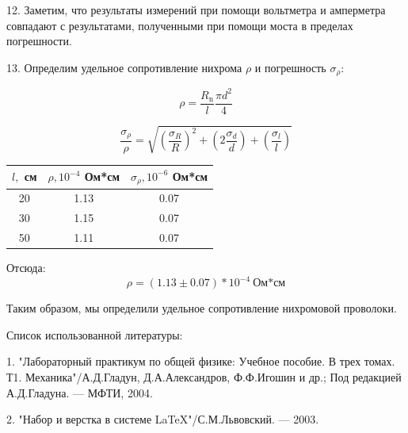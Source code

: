 \documentclass[14pt]{article}
\begin{document}
	
	\vspace{0.5cm}
	12. Заметим, что результаты измерений при помощи вольтметра и амперметра совпадают с результатами, полученными при помощи
	моста в пределах погрешности.
	
	\vspace{0.5cm}
	13. Определим удельное сопротивление нихрома $\rho$ и погрешность $\sigma_\rho$:
	
	$$\rho = \frac{R_\text{n}}{l}\frac{\pi d^2}{4}$$
	
	$$\frac{\sigma_\rho}{\rho} = \sqrt{\left(\frac{\sigma_R}{R}\right)^2 + \left(2\frac{\sigma_d}{d}\right) + 
	\left(\frac{\sigma_l}{l}\right)}$$	
	
	\vspace{0.5cm}
	\begin{center}
	\begin{tabular}{|c|c|c|}
	\hline
	$l,$ см 	& $\rho, 10^{-4}$ Ом*см 	& $\sigma_\rho, 10^{-6}$ Ом*см\\
	\hline
	20			& 1.13 						& 0.07\\
	\hline
	30			& 1.15						& 0.07\\
	\hline
	50			& 1.11						& 0.07\\ 
	\hline
	\end{tabular}
	\end{center}
	
	\vspace{1cm}
	Отсюда:	
	$$\boxed{\boxed{\rho = (1.13 \pm 0.07)*10^{-4}~\text{Ом*см}}}$$
	
	\vspace{1cm}
	Таким образом, мы определили удельное сопротивление нихромовой проволоки. 
	
	\newpage
	Список использованной литературы:
	
	\vspace{0.5cm}
	1. "Лабораторный практикум по общей физике: Учебное пособие. В трех томах. Т1. Механика"/А.Д.Гладун, Д.А.Александров,
	Ф.Ф.Игошин и др.; Под редакцией А.Д.Гладуна. --- МФТИ, 2004.
	
	2. "Набор и верстка в системе \LaTeX "/С.М.Львовский. --- 2003.
	
\end{document}

